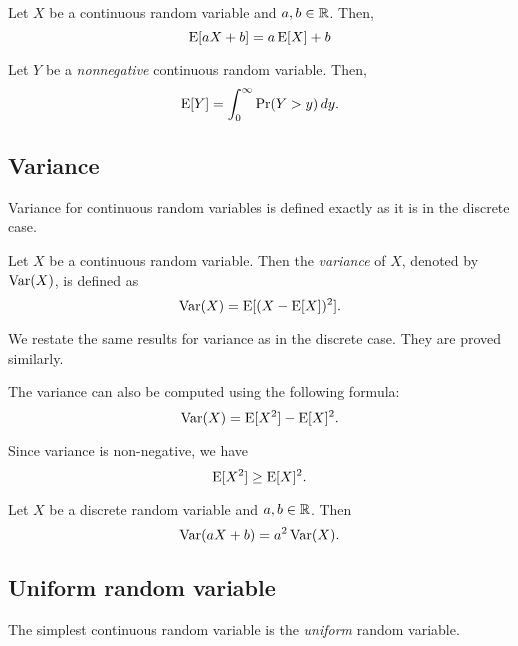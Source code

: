 \documentclass{article}
\begin{document}
\begin{corollary}
  Let $X$ be a continuous random variable and $a, b \in \mathbb{R}$.
  Then,
  \[
    \operatorname{E}[aX + b] = a \operatorname{E}[X] + b
  \]
\end{corollary}

\begin{lemma}
  Let $Y$ be a \emph{nonnegative} continuous random variable.
  Then,
  \[
    \operatorname{E}[Y] = \int_{0}^\infty \Pr(Y > y) \, dy.
  \]
\end{lemma}

\subsection{Variance}

Variance for continuous random variables is defined exactly as it is in the discrete case.

\begin{definition}
  Let $X$ be a continuous random variable.
  Then the \emph{variance} of $X$, denoted by $\operatorname{Var}(X)$, is defined as
  \[
    \operatorname{Var}(X) = \operatorname{E}[(X - \operatorname{E}[X])^2].
  \]
\end{definition}

We restate the same results for variance as in the discrete case.
They are proved similarly.

\begin{remark}
  The variance can also be computed using the following formula:
  \[
    \operatorname{Var}(X) = \operatorname{E}[X^2] - \operatorname{E}[X]^2.
  \]
\end{remark}

\begin{remark}
  Since variance is non-negative, we have
  \[
    \operatorname{E}[X^2] \geq \operatorname{E}[X]^2.
  \]
\end{remark}

\begin{proposition}
  Let $X$ be a discrete random variable and $a, b \in \mathbb{R}$.
  Then
  \[
    \operatorname{Var}(a X + b) = a^2 \operatorname{Var}(X).
  \]
\end{proposition}

\subsection{Uniform random variable}

The simplest continuous random variable is the \emph{uniform} random variable.
\end{document}
